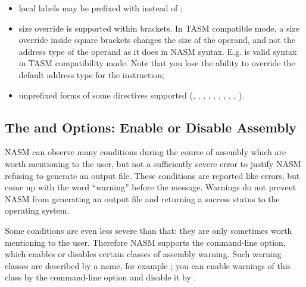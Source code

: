 \begin{itemize}
	\item local labels may be prefixed with  instead of ;

	\item size override is supported within brackets. In TASM compatible mode,
	a size override inside square brackets changes the size of the operand,
	and not the address type of the operand as it does in NASM syntax. E.g.
	 is valid syntax in TASM compatibility mode.
	Note that you lose the ability to override the default address type for
	the instruction;

	\item unprefixed forms of some directives supported (, ,
	, , , , ,
	, , ).
\end{itemize}

\subsection{The  and  Options: Enable or Disable Assembly }
\label{subsec:opt-w}

NASM can observe many conditions during the course of assembly which
are worth mentioning to the user, but not a sufficiently severe
error to justify NASM refusing to generate an output file. These
conditions are reported like errors, but come up with the word
``warning'' before the message. Warnings do not prevent NASM from
generating an output file and returning a success status to the
operating system.

Some conditions are even less severe than that: they are only
sometimes worth mentioning to the user. Therefore NASM supports the
 command-line option, which enables or disables certain
classes of assembly warning. Such warning classes are described by a
name, for example ; you can enable warnings of
this class by the command-line option  and
disable it by .

